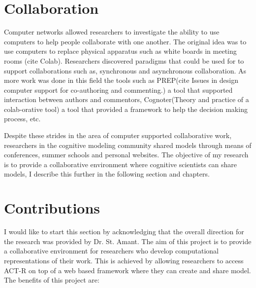 \section {Collaboration}
Computer networks allowed researchers
to investigate the ability to use computers to help people collaborate
with one another. The original idea was to use computers to replace
physical apparatus such as white boards in meeting rooms (cite Colab). 
Researchers discovered paradigms that could be used for to support
collaborations such as, synchronous and asynchronous collaboration. As
more work was done in this field the tools such as PREP(cite Issues in
design computer support for co-authoring and commenting.) a tool that
supported interaction between authors and commentors,
Cognoter(Theory and practice of a colab-orative tool) a tool that
provided a framework to help the decision making process, etc.

Despite these strides in the area of computer supported collaborative
work, researchers in the cognitive modeling community 
shared models through means of conferences, summer schools and
personal websites. The objective of my research is to provide a
collaborative environment where cognitive scientists can share
models, I describe this further in the following section and chapters.

\section{Contributions}

I would like to start this section by acknowledging that the overall
direction for the research was provided by 
Dr. St. Amant. The aim of this project is to provide a collaborative
environment for researchers who develop computational representations
of their work. This is achieved by allowing researchers to access
ACT-R on top of a web based framework where they can create 
and share model. The benefits of this project are:

